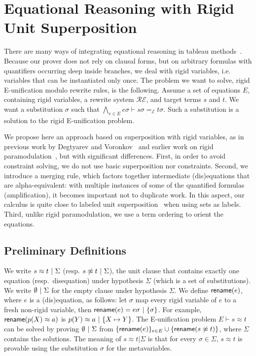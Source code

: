 
\section{Equational Reasoning with Rigid Unit Superposition}
\label{sec:super}

There are many ways of integrating equational reasoning in tableau
methods~\cite{DB75,LS02,BR15,DV96}. Because our prover does not rely on clausal
forms, but on arbitrary formulas with quantifiers occurring deep inside
branches, we deal with rigid variables, i.e. variables that can be instantiated
only once. The problem we want to solve, rigid E-unification modulo rewrite
rules, is the following. Assume a set of equations $E$, containing rigid
variables, a rewrite system $\mathcal{RE}$, and target terms $s$ and $t$. We
want a substitution $\sigma$ such that
$\bigwedge_{e \in E} e\sigma \vdash s\sigma =_\mathcal{E} t\sigma$. Such a
substitution is a solution to the rigid E-unification problem.

We propose here an approach based on superposition with rigid variables, as in
previous work by Degtyarev and Voronkov~\cite{DV96} and earlier work on rigid
paramodulation~\cite{DAP00}, but with significant differences. First, in order
to avoid constraint solving, we do not use basic superposition nor
constraints. Second, we introduce a merging rule, which factors together
intermediate (dis)equations that are alpha-equivalent: with multiple instances
of some of the quantified formulas (amplification), it becomes important not to
duplicate work. In this aspect, our calculus is quite close to labeled unit
superposition~\cite{KS10} when using sets as labels. Third, unlike rigid
paramodulation, we use a term ordering to orient the equations.

\subsection{Preliminary Definitions}

We write $  s \approx t  ~|~  \Sigma$ (resp.
$ s \not\approx t  ~|~  \Sigma$), the unit clause that contains
exactly one equation (resp.~disequation) under hypothesis $\Sigma$ (which is a
set of substitutions). We write $\emptyset ~|~ \Sigma$ for the
empty clause under hypothesis $\Sigma$. We define $\textsf{rename}(e)$, where $e$
is a (dis)equation, as follows: let $\sigma$ map every rigid variable of $e$ to
a fresh non-rigid variable, then
$\textsf{rename}(e) =  e\sigma  ~|~  \{ \sigma \} $. For example,
$\textsf{rename}(p(X)\approx a)$ is $ p(Y)\approx a ~|~  \{ X\mapsto
Y\} $. The E-unification problem $E \vdash s\approx t$ can be solved by proving
$\emptyset  ~|~  \Sigma$ from
$\{ \textsf{rename}(e) \}_{ e \in E } \cup \{ \textsf{rename}( s \not\approx t ) \}$,
where $\Sigma$ contains the solutions. The meaning of $s \approx t | \Sigma$ is
that for every $\sigma \in \Sigma$, $s \approx t$ is provable using the
substitution $\sigma$ for the metavariables.

